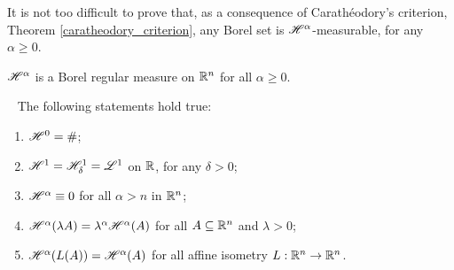It is not too difficult to prove that, as a consequence of Carath\'eodory's criterion, Theorem \ref{caratheodory_criterion}, any Borel set is $\mathscr{H}^{\alpha}$-measurable, for any $\alpha \ge 0$.

\begin{theorem}
$\mathscr{H}^{\alpha}$ is a Borel regular measure on $\mathbb{R}^n$ for all $\alpha \geq
0$.
\end{theorem}

\begin{theorem}~
The following statements hold true:
\begin{enumerate}[(1)]
\item $\mathscr{H}^{0} = \#$; 
\item $\mathscr{H}^{1} = \mathscr{H}^{1}_{\delta} = \mathscr{L}^{1}$ on $\mathbb{R}$, for any $\delta > 0$; 
\item $\mathscr{H}^{\alpha} \equiv 0$ for all $\alpha > n$ in $\mathbb{R}^n$;
\item $\mathscr{H}^{\alpha}(\lambda A) = \lambda^\alpha \mathscr{H}^{\alpha}(A)$ for all $A \subseteq \mathbb{R}^n$ and $\lambda > 0$;
\item $\mathscr{H}^{\alpha}(L(A)) = \mathscr{H}^{\alpha}(A)$ for all affine
isometry $L : \mathbb{R}^n \to \mathbb{R}^n$.
\end{enumerate}
\end{theorem}

